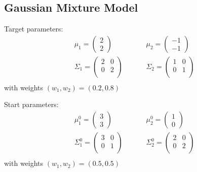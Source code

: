 \subsection{Gaussian Mixture Model}
Target parameters:
\[
\begin{aligned}
	&\mu_1 = \begin{pmatrix} 2 \\ 2 \end{pmatrix}  &\hspace{20pt}  &\mu_2 = \begin{pmatrix} -1 \\ -1 \end{pmatrix} \\
	&\Sigma_1 = 
	\begin{pmatrix}
		2 & 0 \\
		0 & 2 \\
	\end{pmatrix} 
	&\hspace{20pt}
	&\Sigma_2 = 
	\begin{pmatrix}
		1 & 0 \\
		0 & 1 \\
	\end{pmatrix} \\
\end{aligned}
\]
with weights $(w_1, w_2) = ( 0.2, 0.8 )$

Start parameters:
\[
\begin{aligned}
	&\mu_1^0 = \begin{pmatrix} 3 \\ 3 \end{pmatrix}  &\hspace{20pt}  &\mu_2^0 = \begin{pmatrix} 1 \\ 0 \end{pmatrix} \\
	&\Sigma_1^0 = 
	\begin{pmatrix}
		3 & 0 \\
		0 & 1 \\
	\end{pmatrix} 
	&\hspace{20pt}
	&\Sigma_2^0 = 
	\begin{pmatrix}
		2 & 0 \\
		0 & 2 \\
	\end{pmatrix} \\
\end{aligned}
\]
with weights $(w_1, w_2) = ( 0.5, 0.5 )$


